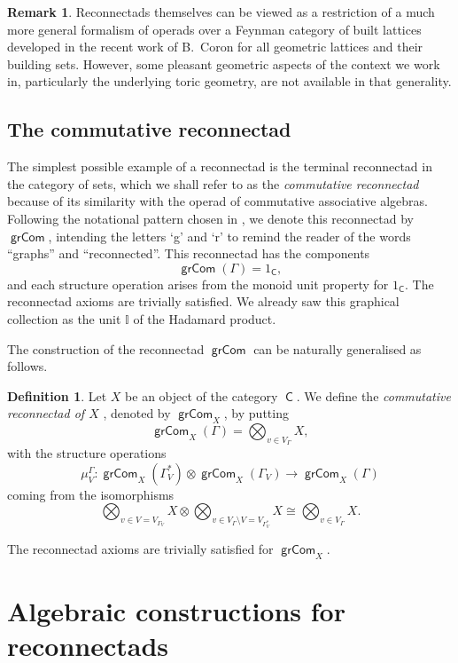 \documentclass[11pt]{article}
\theoremstyle{definition}
\newtheorem{defi}[theo]{Definition}
\newtheorem{rema}[theo]{Remark}
\numberwithin{equation}{section}
\DeclareMathOperator{\sfC}{\mathsf{C}}
\DeclareMathOperator{\grCom}{\mathsf{grCom}}
\begin{document}
\begin{rema}
Reconnectads themselves can be viewed as a restriction of a much more general formalism of operads over a Feynman category of built lattices developed in the recent work of B.~Coron \cite{CoronLattices} for all geometric lattices and their building sets. However, some pleasant geometric aspects of the context we work in, particularly the underlying toric geometry, are not available in that generality. 
\end{rema}

\subsection{The commutative reconnectad}

The simplest possible example of a reconnectad is the terminal reconnectad in the category of sets, which we shall refer to as the \emph{commutative reconnectad} because of its similarity with the operad of commutative associative algebras. Following the notational pattern chosen in \cite{DSVV}, we denote this reconnectad by $\grCom$, intending the letters `g' and `r' to remind the reader of the words ``graphs'' and ``reconnected''. This reconnectad has the components 
 \[
\grCom(\Gamma)=1_{\sfC}, 
 \]
and each structure operation arises from the monoid unit property for $1_{\sfC}$. The reconnectad axioms are trivially satisfied. We already saw this graphical collection as the unit $\mathbb{I}$ of the Hadamard product.

The construction of the reconnectad $\grCom$ can be naturally generalised as follows.

\begin{defi}
Let $X$ be an object of the category $\sfC$. We define the \emph{commutative reconnectad of $X$} , denoted by $\grCom_X$, by putting 
 \[
\grCom_X(\Gamma)=\bigotimes_{v\in V_\Gamma} X, 
 \]
with the structure operations   
 \[
\mu^\Gamma_V\colon\grCom_X(\Gamma^*_V)\otimes\grCom_X(\Gamma_V)\to\grCom_X(\Gamma)
 \]
coming from the isomorphisms 
 \[
\bigotimes_{v\in V=V_{\Gamma_V}} X\otimes \bigotimes_{v\in V_\Gamma\setminus V=V_{\Gamma^*_V}} X\cong \bigotimes_{v\in V_\Gamma} X.
 \]
\end{defi}
The reconnectad axioms are trivially satisfied for $\grCom_X$. 

\section{Algebraic constructions for reconnectads}\label{sec:algebra-reconnectads}
\end{document}
